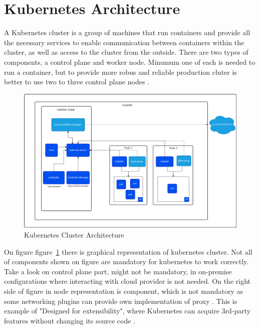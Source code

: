 
\section{Kubernetes Architecture}
\label{sec:k8s_arch}
A Kubernetes cluster is a group of machines that run containers and provide all the necessary services to enable communication between containers within the cluster, as well as access to the cluster from the outside. There are two types of components, a control plane and worker node. Minumum one of each is needed to run a container, but to provide more robus and reliable production cluter is better to use two to three control plane nodes  \cite{KubernetesArch}. 

\begin{figure}[tbh]
    \centering
    \includegraphics[width=1\columnwidth]{images/kubernetes-cluster-architecture.png}
    \caption{Kubernetes Cluster Architecture \cite{KubernetesArch}}
    \label{fig:k8s_arch}
\end{figure}

On figure figure~\ref{fig:k8s_arch} there is graphical representation of kubernetes cluster. Not all of components shown on figure are mandatory for kubernetes to work correctly. Take a look on control plane part, \textit{} might not be mandatory, in on-premise configurations where interacting with cloud provider is not needed. On the right side of figure in node representation is \textit{} component, which is not mandatory as some networking plugins can provide own implementation of proxy \cite{KubernetesArch}. This is example of "Designed for extensibility", where Kubernetes can acquire 3rd-party features without changing its source code \cite{KubernetesDocs}.

